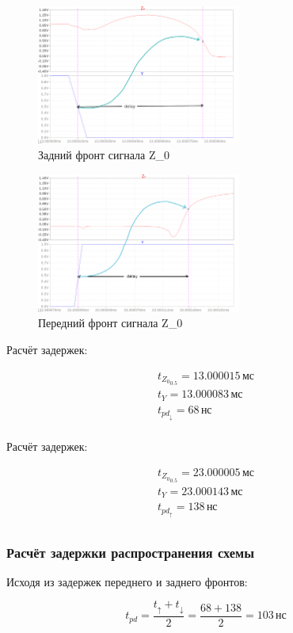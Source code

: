 \setlength{\columnsep}{2.6cm}

\begin{multicols}{2}

	\begin{figure}[H]
		\centering
		\includegraphics[width=0.6\textwidth]{../data/boe_back_delay.png}
		\captionsetup{width=1\textwidth}
		\centering
		\caption{Задний фронт сигнала Z_0}
	\end{figure}

	\begin{figure}[H]
		\centering
		\includegraphics[width=0.6\textwidth]{../data/boe_front_delay.png}
		\captionsetup{width=1\textwidth}
		\centering
		\caption{Передний фронт сигнала Z_0}
	\end{figure}

	\columnbreak

	\centering
	\vspace*{0.9cm}
	Расчёт задержек:

	\vspace*{-0.3cm}
	\[
		\begin{gathered}
			t_{{Z_0}_{0.5}} = 13.000015 \, \text{мс} \\
			t_{Y} = 13.000083 \, \text{мс} \\
			t_{pd_\downarrow} = 68 \, \text{нс} \\
		\end{gathered}
	\]

	\vspace*{5cm}
	Расчёт задержек:

	\vspace*{-0.3cm}
	\[
		\begin{gathered}
			t_{{Z_0}_{0.5}} = 23.000005 \, \text{мс} \\
			t_{Y} = 23.000143 \, \text{мс} \\
			t_{pd_\uparrow} = 138 \, \text{нс} \\
		\end{gathered}
	\]
\end{multicols}

\subsubsection{Расчёт задержки распространения схемы}
Исходя из задержек переднего и заднего фронтов:

\[
	t_{pd} = \frac{t_\uparrow + t_\downarrow}{2} = \frac{68+138}{2} = 103 \, \text{нс}
\]
